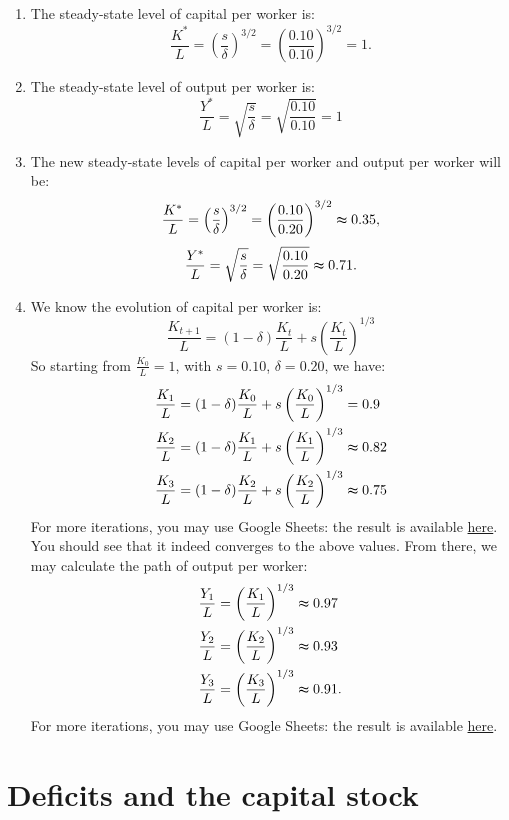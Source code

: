 \documentclass[]{book}
\theoremstyle{definition}
\theoremstyle{definition}
\theoremstyle{definition}
\theoremstyle{remark}
\begin{document}
\begin{enumerate}
\def\labelenumi{\arabic{enumi}.}
\item
  The steady-state level of capital per worker is:
  \[\frac{K^{*}}{L}=\left(\frac{s}{\delta}\right)^{3/2}=\left(\frac{0.10}{0.10}\right)^{3/2}=1.\]
\item
  The steady-state level of output per worker is:
  \[\frac{Y^{*}}{L}=\sqrt{\frac{s}{\delta}}=\sqrt{\frac{0.10}{0.10}}=1\]
\item
  The new steady-state levels of capital per worker and output per
  worker will be:
  \[\frac{K^{*}}{L}=\left(\frac{s}{\delta}\right)^{3/2}=\left(\frac{0.10}{0.20}\right)^{3/2}\thickapprox0.35,\]
  \[\frac{Y^{*}}{L}=\sqrt{\frac{s}{\delta}}=\sqrt{\frac{0.10}{0.20}}\thickapprox0.71.\]
\item
  We know the evolution of capital per worker is:
  \[\frac{K_{t+1}}{L}=(1-\delta)\frac{K_{t}}{L}+s\left(\frac{K_{t}}{L}\right)^{1/3}\]
  So starting from \(\frac{K_{0}}{L}=1\), with \(s=0.10\),
  \(\delta=0.20\), we have: \[\begin{aligned}
  \frac{K_{1}}{L}&=(1-\delta)\frac{K_{0}}{L}+s\left(\frac{K_{0}}{L}\right)^{1/3}=0.9\\
  \frac{K_{2}}{L}&=(1-\delta)\frac{K_{1}}{L}+s\left(\frac{K_{1}}{L}\right)^{1/3}\thickapprox0.82\\
  \frac{K_{3}}{L}&=(1-\delta)\frac{K_{2}}{L}+s\left(\frac{K_{2}}{L}\right)^{1/3}\thickapprox0.75
  \end{aligned}\] For more iterations, you may use Google Sheets: the
  result is available
  \href{https://docs.google.com/spreadsheets/d/1T81-Dx1iUtzE2zUHV9y1rgwYqTKpno47ZCqC1Kmf2aY/edit?usp=sharing}{here}.
  You should see that it indeed converges to the above values. From
  there, we may calculate the path of output per worker:
  \[\begin{aligned}
  \frac{Y_{1}}{L}&=\left(\frac{K_{1}}{L}\right)^{1/3}\thickapprox0.97\\
  \frac{Y_{2}}{L}&=\left(\frac{K_{2}}{L}\right)^{1/3}\thickapprox0.93\\
  \frac{Y_{3}}{L}&=\left(\frac{K_{3}}{L}\right)^{1/3}\thickapprox0.91.
  \end{aligned}\] For more iterations, you may use Google Sheets: the
  result is available
  \href{https://docs.google.com/spreadsheets/d/1T81-Dx1iUtzE2zUHV9y1rgwYqTKpno47ZCqC1Kmf2aY/edit?usp=sharing}{here}.
\end{enumerate}

\section*{Deficits and the capital
stock}\label{deficits-and-the-capital-stock-1}
\end{document}
